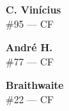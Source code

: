 \documentclass[11pt]{article}
\begin{document}
\begin{minipage}[t]{0.30\textwidth}
\centering
\textbf{C. Vinícius}\\
\#95 --- CF\\
\vspace{0.2cm}
\end{minipage}
\hfill
\begin{minipage}[t]{0.30\textwidth}
\centering
\textbf{André H.}\\
\#77 --- CF\\
\vspace{0.2cm}
\end{minipage}
\hfill
\begin{minipage}[t]{0.30\textwidth}
\centering
\textbf{Braithwaite}\\
\#22 --- CF\\
\vspace{0.2cm}
\end{minipage}
\vspace{0.5cm}
\end{document}
